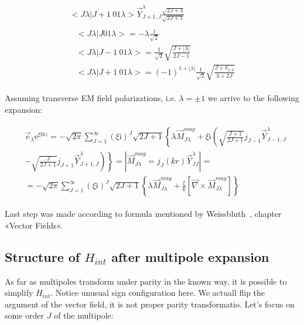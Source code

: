\begin{align}
\begin{split}
            <J \lambda|J+1~0 1 \lambda> \vec{Y}^\lambda_{J+1,J}
            \frac{\sqrt{2J+3}}{\sqrt{2J+1}}
    \end{split}\\
    \begin{split}
        &<J \lambda|J 0 1 \lambda> = -\lambda \frac{1}{\sqrt{2}} \\
        &<J \lambda|J-1~0 1 \lambda> = \frac{1}{\sqrt{2}}
            \sqrt{\frac{J + |\lambda|}{2J-1}} \\
        &<J \lambda | J+1~0 1 \lambda>  = (-1)^{1 + |\lambda|}
            \frac{1}{\sqrt{2}} \sqrt{\frac{J + \delta_{\lambda, 0}}{3 + 2J}}
    \end{split}
\end{align}

Assuming transverse EM field polarizations, i.e.  $\lambda = \pm 1$
we arrive to the following expansion:

\begin{align}
    \begin{split}
        &\vec{e}_{\lambda} \mathrm{e}^{\xi \mathrm{i} k z} =
            -\sqrt{2 \pi} \sum_{J=1}^{\infty} (\xi \mathrm{i})^J \sqrt{2J +1}
            \left\{ \lambda \vec{M}^{mag}_{J\lambda} + \xi \mathrm{i}
            \left( \sqrt{\frac{J+1}{2J+1}} j_{J-1} \vec{Y}^\lambda_{J-1, J} \right. \right. \\
            &\left. \left. -\sqrt{\frac{J}{2J+1}} j_{J+1} \vec{Y}^\lambda_{J+1, J} \right) \right\} = \left| \vec{M}^{mag}_{J \lambda} = j_{J}(kr)
            \vec{Y}^\lambda_{J J} \right| = \\
            &= -\sqrt{2 \pi} \sum_{J=1}^{\infty}
            (\xi \mathrm{i})^J \sqrt{2J +1} \left\{ \lambda \vec{M}^{mag}_{J \lambda}
            +\frac{\xi}{k} \left[ \vec{\nabla} \times
            \vec{M}^{mag}_{J \lambda} \right] \right\}
    \end{split}
\end{align}

Last step was made according to formula mentioned by Weissbluth~\cite{weissbluth}, chapter «Vector Fields».

\subsection{Structure of $H_{int}$ after multipole expansion}

As far as multipoles transform under parity in the known way, it is possible to simplify $H_{int}$. Notice unusual sign configuration here. We actuall flip the argument of the vector field, it is not proper parity transformatio. Let's focus on some order $J$ of the multipole:

